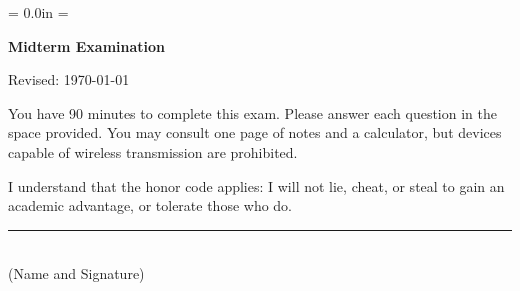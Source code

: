 \documentclass[letterpaper,12pt]{exam}
\def\HeadName{Midterm Examination}
\begin{document}
\parindent = 0.0in
\parskip = \bigskipamount
\thispagestyle{empty}%
\Head

\centerline{\large \bf \HeadName}%
\centerline{Revised:  \today}

\bigskip
You have 90 minutes to complete this exam.  Please answer each
question in the space provided. You may consult one page of notes
and a calculator, but devices capable of wireless transmission are
prohibited.

I understand that the honor code applies: I will not lie, cheat,
or steal to gain an academic advantage, or tolerate those who do.

\begin{flushright}
\rule{4in}{0.5pt} \\ (Name and Signature)
\end{flushright}


\end{document}
